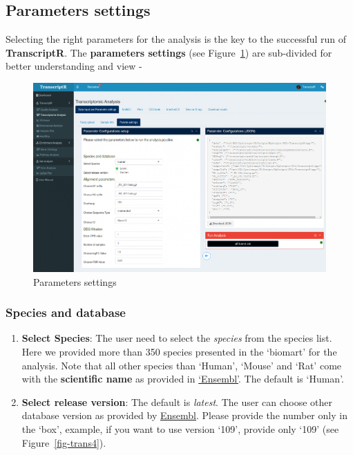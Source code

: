 \documentclass[
  a4paper,
  oneside,
  open=any]{scrreport}
\providecommand{\tightlist}{%
  \setlength{\itemsep}{0pt}\setlength{\parskip}{0pt}}\usepackage{longtable,booktabs,array}
\begin{document}
\hypertarget{parameters-settings}{%
\subsection{Parameters settings}\label{parameters-settings}}

Selecting the right parameters for the analysis is the key to the
successful run of \textbf{TranscriptR}. The \textbf{parameters settings}
(see Figure~\ref{fig-trans3}) are sub-divided for better understanding
and view -

\begin{figure}[H]

{\centering \includegraphics{./images/transcriptome/transcriptr4.png}

}

\caption{\label{fig-trans3}Parameters settings}

\end{figure}

\hypertarget{species-and-database}{%
\subsubsection{Species and database}\label{species-and-database}}

\begin{enumerate}
\def\labelenumi{\arabic{enumi}.}
\tightlist
\item
  \textbf{Select Species}: The user need to select the \emph{species}
  from the species list. Here we provided more than 350 species
  presented in the `biomart' for the analysis. Note that all other
  species than `Human', `Mouse' and `Rat' come with the
  \textbf{scientific name} as provided in
  \href{http://www.ensembl.org/info/about/species.html}{`Ensembl'}. The
  default is `Human'.
\item
  \textbf{Select release version}: The default is \emph{latest}. The
  user can choose other database version as provided by
  \href{https://ftp.ensembl.org/pub/}{Ensembl}. Please provide the
  number only in the `box', example, if you want to use version `109',
  provide only `109' (see Figure~\ref{fig-trans4}).
\end{enumerate}
\end{document}
